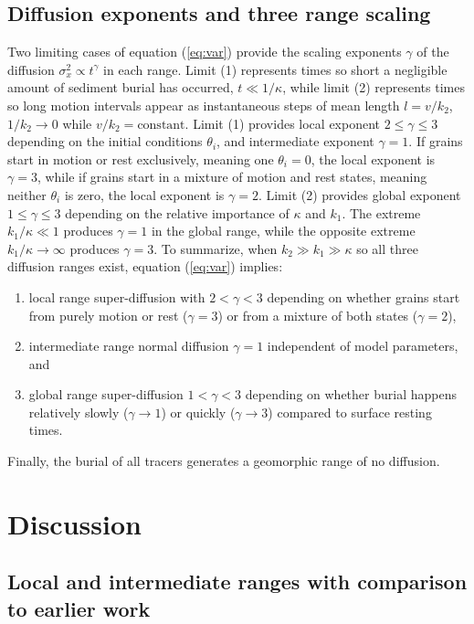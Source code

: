 \subsection{Diffusion exponents and three range scaling}

Two limiting cases of equation (\ref{eq:var}) provide the scaling exponents $\gamma$ of the diffusion $\sigma_x^2 \propto t^\gamma$ in each range. Limit (1) represents times so short a negligible amount of sediment burial has occurred, $t\ll 1/\kappa$, while limit (2) represents times so long motion intervals appear as instantaneous steps of mean length $l=v/k_2$, $1/k_2 \rightarrow 0$ while $v/k_2 = \text{constant}$.
Limit (1) provides local exponent $2 \leq \gamma \leq 3$ depending on the initial conditions $\theta_i$, and intermediate exponent $\gamma=1$.
If grains start in motion or rest exclusively, meaning one $\theta_i = 0$, the local exponent is $\gamma=3$, while if grains start in a mixture of motion and rest states, meaning neither $\theta_i$ is zero, the local exponent is $\gamma=2$.
Limit (2) provides global exponent $1 \leq \gamma \leq 3$ depending on the relative importance of $\kappa$ and $k_1$.
The extreme $k_1/\kappa \ll 1$ produces $\gamma=1$ in the global range, while the opposite extreme $k_1/\kappa \rightarrow \infty$ produces $\gamma=3$.
To summarize, when $k_2\gg k_1 \gg \kappa$ so all three diffusion ranges exist, equation (\ref{eq:var}) implies:
\begin{enumerate}
	\item local range super-diffusion with $2<\gamma<3$ depending on whether grains start from purely motion or rest ($\gamma=3$) or from a mixture of both states ($\gamma=2$),
	\item intermediate range normal diffusion $\gamma=1$ independent of model parameters, and
	\item global range super-diffusion $1<\gamma<3$ depending on whether burial happens relatively slowly ($\gamma \rightarrow 1$) or quickly ($\gamma \rightarrow 3$) compared to surface resting times.
\end{enumerate}
Finally, the burial of all tracers generates a geomorphic range of no diffusion.

\section{Discussion}
\label{sec:discussion}

\subsection{Local and intermediate ranges with comparison to earlier work}


